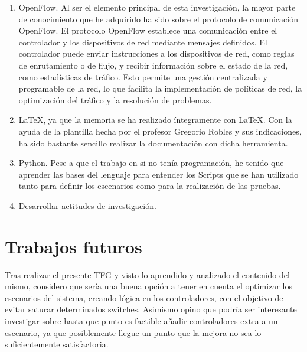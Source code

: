 \documentclass[a4paper, 12pt]{book}
\begin{document}
	\begin{enumerate}
		\item OpenFlow. Al ser el elemento principal de esta investigación, la mayor parte de conocimiento que he adquirido ha sido sobre el protocolo de comunicación OpenFlow. El protocolo OpenFlow establece una comunicación entre el controlador y los dispositivos de red mediante mensajes definidos. El controlador puede enviar instrucciones a los dispositivos de red, como reglas de enrutamiento o de flujo, y recibir información sobre el estado de la red, como estadísticas de tráfico. Esto permite una gestión centralizada y programable de la red, lo que facilita la implementación de políticas de red, la optimización del tráfico y la resolución de problemas.
		\item LaTeX, ya que la memoria se ha realizado íntegramente con LaTeX. Con la ayuda de la plantilla hecha por el profesor Gregorio Robles y sus indicaciones, ha sido bastante sencillo realizar la documentación con dicha herramienta.
		\item Python. Pese a que el trabajo en si no tenía programación, he tenido que aprender las bases del lenguaje para entender los Scripts que se han utilizado tanto para definir los escenarios como para la realización de las pruebas.
		\item Desarrollar actitudes de investigación.
		
	\end{enumerate}
	
	
	\section{Trabajos futuros}
	\label{sec:trabajos_futuros}
	
	Tras realizar el presente TFG y visto lo aprendido y analizado el contenido del mismo, considero que sería una buena opción a tener en cuenta el optimizar los escenarios del sistema, creando lógica en los controladores, con el objetivo de evitar saturar determinados switches. Asimismo opino que podría ser interesante investigar sobre hasta que punto es factible añadir controladores extra a un escenario, ya que posiblemente llegue un punto que la mejora no sea lo suficientemente satisfactoria.
	
	
	
\end{document}
